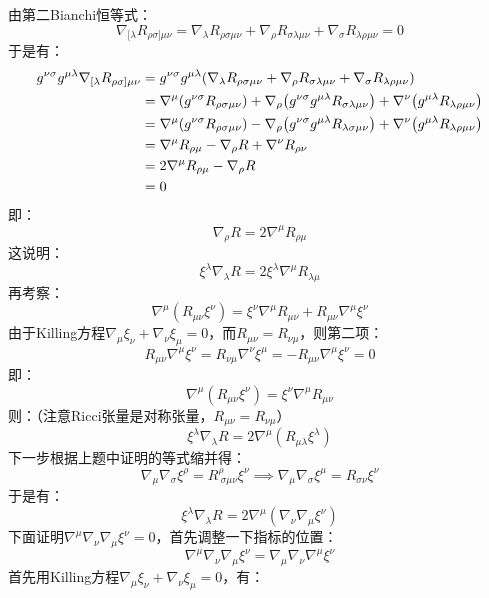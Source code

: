 \documentclass[a4paper]{article}
\begin{document}
\begin{enumerate}
    由第二Bianchi恒等式：
    \[
        \nabla_{[\lambda} R_{\rho\sigma]\mu\nu} = \nabla_\lambda R_{\rho\sigma\mu\nu} + \nabla_\rho R_{\sigma\lambda\mu\nu} + \nabla_\sigma R_{\lambda\rho\mu\nu} = 0
    \]
    于是有：
    \begin{align*}
        g^{\nu\sigma} g^{\mu\lambda} \nabla_{[\lambda} R_{\rho\sigma]\mu\nu}
        &= g^{\nu\sigma} g^{\mu\lambda} \qty(\nabla_\lambda R_{\rho\sigma\mu\nu} + \nabla_\rho R_{\sigma\lambda\mu\nu} + \nabla_\sigma R_{\lambda\rho\mu\nu}) \\
        &= \nabla^\mu \qty(g^{\nu\sigma} R_{\rho\sigma\mu\nu}) + \nabla_\rho \qty(g^{\nu\sigma} g^{\mu\lambda} R_{\sigma\lambda\mu\nu}) + \nabla^\nu \qty(g^{\mu\lambda} R_{\lambda\rho\mu\nu}) \\
        &= \nabla^\mu \qty(g^{\nu\sigma} R_{\rho\sigma\mu\nu}) - \nabla_\rho \qty(g^{\nu\sigma} g^{\mu\lambda} R_{\lambda\sigma\mu\nu}) + \nabla^\nu \qty(g^{\mu\lambda} R_{\lambda\rho\mu\nu}) \\
        &= \nabla^\mu R_{\rho\mu} - \nabla_\rho R + \nabla^\nu R_{\rho\nu} \\
        &= 2 \nabla^\mu R_{\rho\mu} - \nabla_\rho R \\
        &= 0
    \end{align*}
    即：
    \[
        \nabla_\rho R = 2 \nabla^\mu R_{\rho\mu}
    \]
    这说明：
    \[
        \xi^\lambda \nabla_\lambda R = 2 \xi^\lambda \nabla^\mu R_{\lambda\mu}
    \]
    再考察：
    \[
        \nabla^\mu (R_{\mu\nu} \xi^\nu) = \xi^\nu \nabla^\mu R_{\mu\nu} + R_{\mu\nu} \nabla^\mu \xi^\nu
    \]
    由于Killing方程$\nabla_\mu \xi_\nu + \nabla_\nu \xi_\mu = 0$，而$R_{\mu\nu} = R_{\nu\mu}$，则第二项：
    \[
        R_{\mu\nu} \nabla^\mu \xi^\nu = R_{\nu\mu} \nabla^\nu \xi^\mu = -R_{\mu\nu} \nabla^\mu \xi^\nu = 0
    \]
    即：
    \[
        \nabla^\mu (R_{\mu\nu} \xi^\nu) = \xi^\nu \nabla^\mu R_{\mu\nu}
    \]
    则：（注意Ricci张量是对称张量，$R_{\mu\nu} = R_{\nu\mu}$）
    \[
        \xi^\lambda \nabla_\lambda R = 2 \nabla^\mu (R_{\mu\lambda} \xi^\lambda)
    \]
    下一步根据上题中证明的等式缩并得：
    \[
        \nabla_\mu \nabla_\sigma \xi^\rho = R^\rho_{\ \sigma\mu\nu} \xi^\nu \implies \nabla_\mu \nabla_\sigma \xi^\mu = R_{\sigma\nu} \xi^\nu
    \]
    于是有：
    \[
        \xi^\lambda \nabla_\lambda R = 2 \nabla^\mu (\nabla_\nu \nabla_\mu \xi^\nu)
    \]
    下面证明$\nabla^\mu \nabla_\nu \nabla_\mu \xi^\nu = 0$，首先调整一下指标的位置：
    \[
        \nabla^\mu \nabla_\nu \nabla_\mu \xi^\nu = \nabla_\mu \nabla_\nu \nabla^\mu \xi^\nu
    \]
    首先用Killing方程$\nabla_\mu \xi_\nu + \nabla_\nu \xi_\mu = 0$，有：

\end{enumerate}
\end{document}
